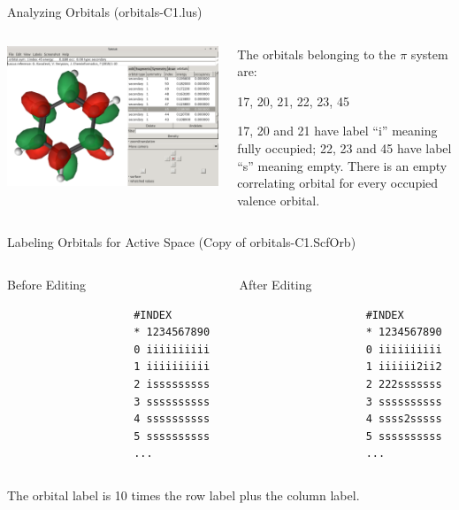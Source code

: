 \documentclass[12pt,aspectratio=169]{beamer}
\begin{document}
	\begin{frame}{Analyzing Orbitals (orbitals-C1.lus)}
		\begin{columns}
			\begin{column}{.5\linewidth}
				\includegraphics[width=\linewidth]{analyze.png}
			\end{column}
			\begin{column}{.5\linewidth}
				The orbitals belonging to the $\pi$ system are:
				
				17, 20, 21, 22, 23, 45
				
				17, 20 and 21 have label ``i'' meaning fully occupied; 22, 23 and 45 have label ``s'' meaning empty.  There is an empty correlating orbital for every occupied valence orbital.
			\end{column}
		\end{columns}
	\end{frame}

	\begin{frame}[fragile]{Labeling Orbitals for Active Space (Copy of orbitals-C1.ScfOrb)}
		\begin{columns}
			\begin{column}{.5\linewidth}
				
				
				Before Editing
				\begin{verbatim}
					#INDEX
					* 1234567890
					0 iiiiiiiiii
					1 iiiiiiiiii
					2 isssssssss
					3 ssssssssss
					4 ssssssssss
					5 ssssssssss
					...
				\end{verbatim}
			\end{column}
			\begin{column}{.5\linewidth}
				
				
				After Editing
				\begin{verbatim}
					#INDEX
					* 1234567890
					0 iiiiiiiiii
					1 iiiiii2ii2
					2 222sssssss
					3 ssssssssss
					4 ssss2sssss
					5 ssssssssss
					...
				\end{verbatim}
			\end{column}
		\end{columns}
		The orbital label is 10 times the row label plus the column label.
	\end{frame}
\end{document}
